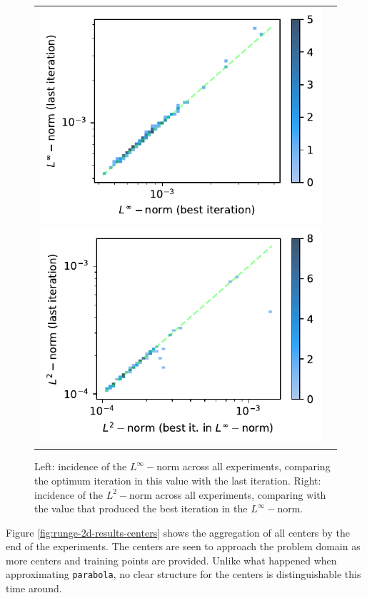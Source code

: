 \documentclass[12pt]{report} %
\begin{document}
\begin{figure}
  \hspace*{-2cm}
  \begin{tabular}{cc}
    \includegraphics[width=.6\textwidth]{imagenes/experiments/2d/statistical_2d_full_scheduler_interpolation/runge_2d/incidence_of_linf_runge_2d.pdf}
    \includegraphics[width=.6\textwidth]{imagenes/experiments/2d/statistical_2d_full_scheduler_interpolation/runge_2d/incidence_of_l2_runge_2d.pdf}
  \end{tabular}
  \caption{Left: incidence of the $L^\infty-$norm across all experiments, comparing the optimum iteration in this value with the last iteration. Right: incidence of the $L^2-$norm across all experiments, comparing with the value that produced the best iteration in the $L^\infty-$norm.}
  \label{fig:runge-2d-results-incidence-l-norms}
\end{figure}

Figure \ref{fig:runge-2d-results-centers} shows the aggregation of all centers by the end of the experiments. The centers are seen to approach the problem domain as more centers and training points are provided. Unlike what happened when approximating \texttt{parabola}, no clear structure for the centers is distinguishable this time around.
\end{document}
